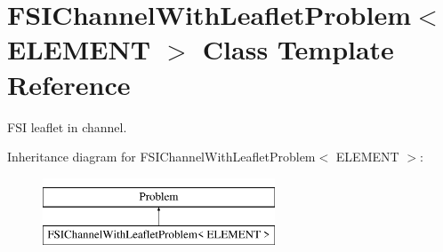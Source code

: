 \hypertarget{classFSIChannelWithLeafletProblem}{}\section{F\+S\+I\+Channel\+With\+Leaflet\+Problem$<$ E\+L\+E\+M\+E\+NT $>$ Class Template Reference}
\label{classFSIChannelWithLeafletProblem}


F\+SI leaflet in channel.  


Inheritance diagram for F\+S\+I\+Channel\+With\+Leaflet\+Problem$<$ E\+L\+E\+M\+E\+NT $>$\+:\begin{figure}[H]
\begin{center}
\leavevmode
\includegraphics[height=2.000000cm]{classFSIChannelWithLeafletProblem}
\end{center}
\end{figure}
